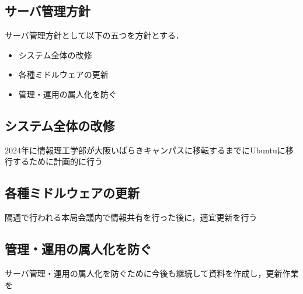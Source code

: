\subsection*{サーバ管理方針}


サーバ管理方針として以下の五つを方針とする．
\begin{itemize}
    \item システム全体の改修
    \item 各種ミドルウェアの更新
    \item 管理・運用の属人化を防ぐ
\end{itemize}

\subsection*{システム全体の改修}
2024年に情報理工学部が大阪いばらきキャンパスに移転するまでにUbuntuに移行するために計画的に行う

\subsection*{各種ミドルウェアの更新}
隔週で行われる本局会議内で情報共有を行った後に，適宜更新を行う

\subsection*{管理・運用の属人化を防ぐ}
サーバ管理・運用の属人化を防ぐために今後も継続して資料を作成し，更新作業を

